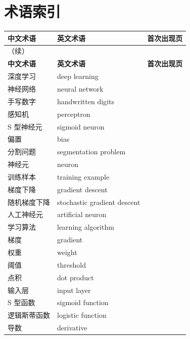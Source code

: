 
\chapter*{术语索引}
{}

\begingroup
\small
\renewcommand{\arraystretch}{1.25}
\begin{longtable}{p{}p{}r}
\textbf{中文术语} & \textbf{英文术语} & \textbf{首次出现页} \\
\hline
\endfirsthead
\multicolumn{3}{l}{\small（续）}\\
\hline
\textbf{中文术语} & \textbf{英文术语} & \textbf{首次出现页} \\
\hline
\endhead
\hline
\endfoot
深度学习 & deep learning & \pageref{term:0} \\
神经网络 & neural network & \pageref{term:1} \\
手写数字 & handwritten digits & \pageref{term:2} \\
感知机 & perceptron & \pageref{term:3} \\
S 型神经元 & sigmoid neuron & \pageref{term:4} \\
偏置 & bias & \pageref{term:5} \\
分割问题 & segmentation problem & \pageref{term:6} \\
神经元 & neuron & \pageref{term:7} \\
训练样本 & training example & \pageref{term:8} \\
梯度下降 & gradient descent & \pageref{term:9} \\
随机梯度下降 & stochastic gradient descent & \pageref{term:10} \\
人工神经元 & artificial neuron & \pageref{term:11} \\
学习算法 & learning algorithm & \pageref{term:12} \\
梯度 & gradient & \pageref{term:13} \\
权重 & weight & \pageref{term:14} \\
阈值 & threshold & \pageref{term:15} \\
点积 & dot product & \pageref{term:16} \\
输入层 & input layer & \pageref{term:17} \\
S 型函数 & sigmoid function & \pageref{term:18} \\
逻辑斯蒂函数 & logistic function & \pageref{term:19} \\
导数 & derivative & \pageref{term:20} \\

\end{longtable}

